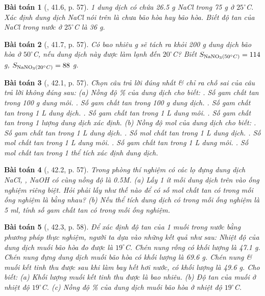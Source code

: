 \documentclass{article}
\newtheorem{baitoan}{Bài toán}
\begin{document}
\begin{baitoan}[\cite{SBT_Hoa_Hoc_8}, 41.6, p. 57]
	1 dung dịch có chứa \emph{26.5 g NaCl} trong \emph{75 g } ở $25^\circ$\emph{C}. Xác định dung dịch \emph{NaCl} nói trên là chưa bão hòa hay bão hòa. Biết độ tan của \emph{NaCl} trong nước ở $25^\circ$\emph{C} là \emph{36 g}.
\end{baitoan}

\begin{baitoan}[\cite{SBT_Hoa_Hoc_8}, 41.7, p. 57]
	Có bao nhiêu \emph{g } sẽ tách ra khỏi \emph{200 g} dung dịch bão hòa \emph{} ở $50^\circ$\emph{C}, nếu dung dịch này được làm lạnh đến $20^\circ$\emph{C}? Biết \emph{$S_{\ce{NaNO3}(50^\circ C)} = 114$ g, $S_{\ce{NaNO3}(20^\circ C)} = 88$ g}.
\end{baitoan}

\begin{baitoan}[\cite{SBT_Hoa_Hoc_8}, 42.1, p. 57]
	Chọn câu trả lời đúng nhất \& chỉ ra chỗ sai của câu trả lời không đúng sau: (a) Nồng độ \% của dung dịch cho biết: {.} Số gam chất tan trong \emph{100 g} dung môi. {.} Số gam chất tan trong \emph{100 g} dung dịch. {.} Số gam chất tan trong \emph{1 L} dung dịch. {.} Số gam chất tan trong \emph{1 L} dung môi. {.} Số gam chất tan trong 1 lượng dung dịch xác định. (b) Nồng độ mol của dung dịch cho biết: {.} Số gam chất tan trong \emph{1 L} dung dịch. {.} Số mol chất tan trong \emph{1 L} dung dịch. {.} Số mol chất tan trong \emph{1 L} dung môi. {.} Số gam chất tan trong \emph{1 L} dung môi. {.} Số mol chất tan trong 1 thể tích xác định dung dịch.
\end{baitoan}

\begin{baitoan}[\cite{SBT_Hoa_Hoc_8}, 42.2, p. 57]
	Trong phòng thí nghiệm có các lọ đựng dung dịch \emph{NaCl, , NaOH} có cùng nồng độ là \emph{0.5M}. (a) Lấy 1 ít mỗi dung dịch trên vào ống nghiệm riêng biệt. Hỏi phải lấy như thế nào để có số mol chất tan có trong mỗi ống nghiệm là bằng nhau? (b) Nếu thể tích dung dịch có trong mỗi ống nghiệm là \emph{5 ml}, tính số gam chất tan có trong mỗi ống nghiệm.
\end{baitoan}

\begin{baitoan}[\cite{SBT_Hoa_Hoc_8}, 42.3, p. 58]
	Để xác định độ tan của 1 muối trong nước bằng phương pháp thực nghiệm, người ta dựa vào những kết quả như sau: Nhiệt độ của dung dịch muối bão hòa đo được là $19^\circ$\emph{C}. Chén nung rỗng có khối lượng là \emph{47.1 g}. Chén nung đựng dung dịch muối bão hòa có khối lượng là \emph{69.6 g}. Chén nung \& muối kết tinh thu được sau khi làm bay hết hơi nước, có khối lượng là \emph{49.6 g}. Cho biết: (a) Khối lượng muối kết tinh thu được là bao nhiêu. (b) Độ tan của muối ở nhiệt độ $19^\circ$\emph{C}. (c) Nồng độ \% của dung dịch muối bão hòa ở nhiệt độ $19^\circ$\emph{C}.
\end{baitoan}
\end{document}

